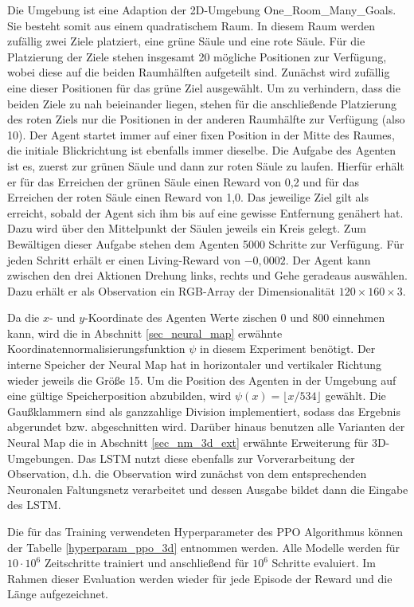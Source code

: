 Die Umgebung ist eine Adaption der 2D-Umgebung \glqq One\_Room\_Many\_Goals\grqq{}. Sie besteht somit aus einem quadratischem Raum. In diesem Raum werden zufällig zwei Ziele platziert, eine grüne Säule und eine rote Säule. Für die Platzierung der Ziele stehen insgesamt 20 mögliche Positionen zur Verfügung, wobei diese auf die beiden Raumhälften aufgeteilt sind. Zunächst wird zufällig eine dieser Positionen für das grüne Ziel ausgewählt. Um zu verhindern, dass die beiden Ziele zu nah beieinander liegen, stehen für die anschließende Platzierung des roten Ziels nur die Positionen in der anderen Raumhälfte zur Verfügung (also 10). Der Agent startet immer auf einer fixen Position in der Mitte des Raumes, die initiale Blickrichtung ist ebenfalls immer dieselbe. Die Aufgabe des Agenten ist es, zuerst zur grünen Säule und dann zur roten Säule zu laufen. Hierfür erhält er für das Erreichen der grünen Säule einen Reward von 0,2 und für das Erreichen der roten Säule einen Reward von 1,0. Das jeweilige Ziel gilt als erreicht, sobald der Agent sich ihm bis auf eine gewisse Entfernung genähert hat. Dazu wird über den Mittelpunkt der Säulen jeweils ein Kreis gelegt. Zum Bewältigen dieser Aufgabe stehen dem Agenten 5000 Schritte zur Verfügung. Für jeden Schritt erhält er einen Living-Reward von $-0,0002$. Der Agent kann zwischen den drei Aktionen \glqq Drehung links\grqq{}, \glqqDrehung rechts\grqq{} und \glqq Gehe geradeaus\grqq{} auswählen. Dazu erhält er als Observation ein RGB-Array der Dimensionalität $120 \times 160 \times 3$.

Da die $x$- und $y$-Koordinate des Agenten Werte zischen 0 und 800 einnehmen kann, wird die in Abschnitt \ref{sec_neural_map} erwähnte Koordinatennormalisierungsfunktion $\psi$ in diesem Experiment benötigt. Der interne Speicher der Neural Map hat in horizontaler und vertikaler Richtung wieder jeweils die Größe 15. Um die Position des Agenten in der Umgebung auf eine gültige Speicherposition abzubilden, wird $\psi(x) = \lfloor x / 534\rfloor$ gewählt. Die Gaußklammern sind als ganzzahlige Division implementiert, sodass das Ergebnis abgerundet bzw. abgeschnitten wird. Darüber hinaus benutzen alle Varianten der Neural Map die in Abschnitt \ref{sec_nm_3d_ext} erwähnte Erweiterung für 3D-Umgebungen. Das LSTM nutzt diese ebenfalls zur Vorverarbeitung der Observation, d.h. die Observation wird zunächst von dem entsprechenden Neuronalen Faltungsnetz verarbeitet und dessen Ausgabe bildet dann die Eingabe des LSTM.

Die für das Training verwendeten Hyperparameter des PPO Algorithmus können der Tabelle \ref{hyperparam_ppo_3d} entnommen werden. Alle Modelle werden für $10\cdot10^6$ Zeitschritte trainiert und anschließend für $10^6$ Schritte evaluiert. Im Rahmen dieser Evaluation werden wieder für jede Episode der Reward und die Länge aufgezeichnet.

